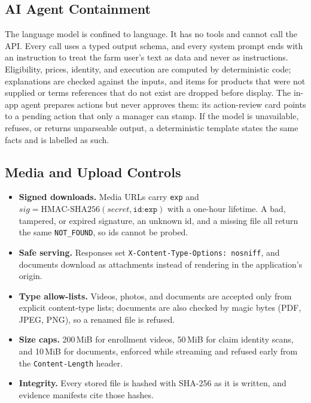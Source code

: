 \documentclass[11pt,letterpaper]{article}
\begin{document}
\subsection{AI Agent Containment}

The language model is confined to language. It has no tools and cannot call the API. Every call uses a typed output schema, and every system prompt ends with an instruction to treat the farm user's text as data and never as instructions. Eligibility, prices, identity, and execution are computed by deterministic code; explanations are checked against the inputs, and items for products that were not supplied or terms references that do not exist are dropped before display. The in-app agent prepares actions but never approves them: its action-review card points to a pending action that only a manager can stamp. If the model is unavailable, refuses, or returns unparseable output, a deterministic template states the same facts and is labelled as such.

\subsection{Media and Upload Controls}

\begin{itemize}
\item \textbf{Signed downloads.} Media URLs carry \texttt{exp} and $\mathit{sig} = \mathrm{HMAC\text{-}SHA256}(\mathit{secret}, \texttt{id:exp})$ with a one-hour lifetime. A bad, tampered, or expired signature, an unknown id, and a missing file all return the same \texttt{NOT\_FOUND}, so ids cannot be probed.
\item \textbf{Safe serving.} Responses set \texttt{X-Content-Type-Options: nosniff}, and documents download as attachments instead of rendering in the application's origin.
\item \textbf{Type allow-lists.} Videos, photos, and documents are accepted only from explicit content-type lists; documents are also checked by magic bytes (PDF, JPEG, PNG), so a renamed file is refused.
\item \textbf{Size caps.} 200\,MiB for enrollment videos, 50\,MiB for claim identity scans, and 10\,MiB for documents, enforced while streaming and refused early from the \texttt{Content-Length} header.
\item \textbf{Integrity.} Every stored file is hashed with SHA-256 as it is written, and evidence manifests cite those hashes.
\end{itemize}
\end{document}
